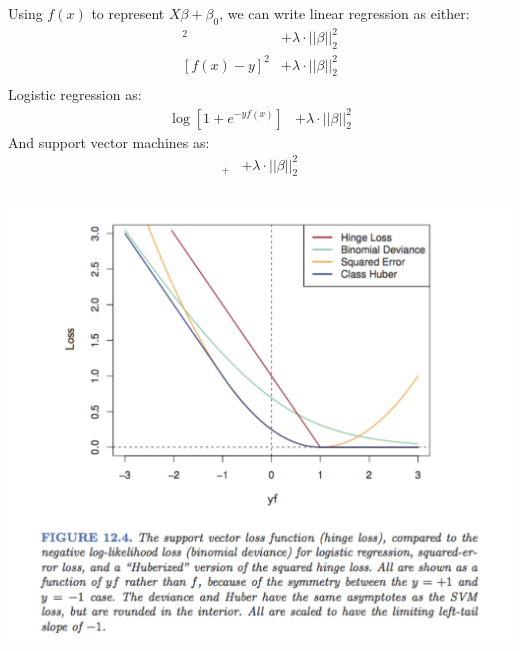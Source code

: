 \documentclass[xetex,mathserif,serif,aspectratio=169]{beamer}
\begin{document}
\begin{frame}[fragile] \frametitle{} \oldB \small

\textbf{}

Using $f(x)$ to represent $X \beta + \beta_0$, we can write
linear regression as either:
\begin{align*}
[1 - y f(x)]^2   &+ \lambda \cdot || \beta ||_2^2 \\
[f(x) - y]^2     &+ \lambda \cdot || \beta ||_2^2 \\
\end{align*}
Logistic regression as:
\begin{align*}
\log[1 + e^{-y f(x)}]   &+ \lambda \cdot || \beta ||_2^2
\end{align*}
And support vector machines as:
\begin{align*}
[1 - y f(x)]_{+} &+ \lambda \cdot || \beta ||_2^2 \\
\end{align*}

\end{frame}

\begin{frame}[fragile] \frametitle{} \oldB \small

\begin{center}
\includegraphics[height=0.7\textheight]{img/lossChoice.pdf}
\end{center}

\end{frame}
\end{document}
